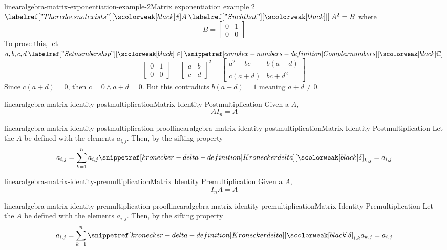 \documentclass[preview]{standalone}
\begin{document}
\begin{snippetexample}{linearalgebra-matrix-exponentiation-example-2}{Matrix exponentiation example 2}
    \(\nexists A \suchthat A^2 = B\) where
    \[
        B = \begin{bmatrix}
            0 & 1 \\
            0 & 0
        \end{bmatrix}
    \]
    To prove this, let \(a,b,c,d \in \complexnumbers\)
    \[
        \begin{bmatrix}
            0 & 1 \\
            0 & 0
        \end{bmatrix}
        =
        {\begin{bmatrix}
            a & b \\
            c & d
        \end{bmatrix}}^2
        =
        \begin{bmatrix}
            a^2+bc & b(a+d) \\
            c(a+d) & bc+d^2
        \end{bmatrix}
    \]
    Since \(c(a+d)=0\), then \(c=0 \land a+d=0\).
    But this contradicts \(b(a+d)=1\) meaning \(a+d \neq 0\).
\end{snippetexample}

\begin{snippetproposition}{linearalgebra-matrix-identity-postmultiplication}{Matrix Identity Postmultiplication}
    Given a \matrix \(A\),
    \[ AI_n=A \]
\end{snippetproposition}

\begin{snippetproof}{linearalgebra-matrix-identity-postmultiplication-proof}{linearalgebra-matrix-identity-postmultiplication}{Matrix Identity Postmultiplication}
    Let the \matrix \(A\) be defined with the
    elements \(a_{i,j}\).
    Then, by the sifting property %
    \[
        a_{i,j} = \sum_{k=1}^n
        a_{i,j}\kronecker_{k,j} = a_{i,j}
    \]
\end{snippetproof}

\begin{snippetproposition}{linearalgebra-matrix-identity-premultiplication}{Matrix Identity Premultiplication}
    Given a \matrix \(A\),
    \[ I_n A=A \]
\end{snippetproposition}

\begin{snippetproof}{linearalgebra-matrix-identity-premultiplication-proof}{linearalgebra-matrix-identity-premultiplication}{Matrix Identity Premultiplication}
    Let the \matrix \(A\) be defined with the
    elements \(a_{i,j}\).
    Then, by the sifting property %
    \[
        a_{i,j} = \sum_{k=1}^n
        \kronecker_{i,k}a_{k,j} = a_{i,j}
    \]
\end{snippetproof}
\end{document}
